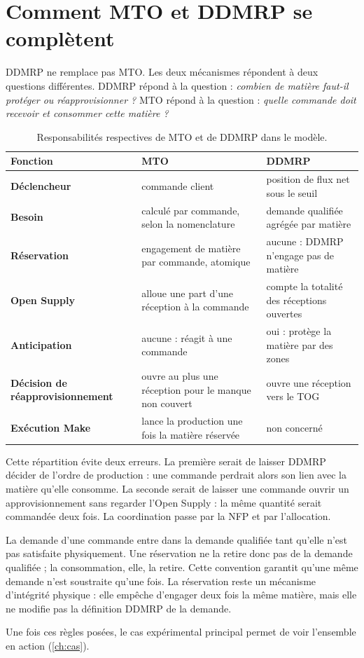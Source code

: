 \chapter{Comment MTO et DDMRP se complètent}\label{ch:mto-ddmrp}

DDMRP ne remplace pas MTO. Les deux mécanismes répondent à deux questions différentes.
DDMRP répond à la question : \emph{combien de matière faut-il protéger ou réapprovisionner ?}
MTO répond à la question : \emph{quelle commande doit recevoir et consommer cette matière ?}

\begin{table}[H]
  \centering
  \caption{Responsabilités respectives de MTO et de DDMRP dans le modèle.}\label{tab:mto-ddmrp}
  \begin{tabularx}{\textwidth}{@{}>{\bfseries}L{3.6cm}YY@{}}
    \toprule
    Fonction & MTO & DDMRP \\
    \midrule
    Déclencheur & commande client & position de flux net sous le seuil \\
    Besoin & calculé par commande, selon la nomenclature & demande qualifiée agrégée par matière \\
    Réservation & engagement de matière par commande, atomique & aucune : DDMRP n'engage pas de matière \\
    Open Supply & alloue une part d'une réception à la commande & compte la totalité des réceptions ouvertes \\
    Anticipation & aucune : réagit à une commande & oui : protège la matière par des zones \\
    Décision de réapprovisionnement & ouvre au plus une réception pour le manque non couvert & ouvre une réception vers le TOG \\
    Exécution Make & lance la production une fois la matière réservée & non concerné \\
    \bottomrule
  \end{tabularx}
\end{table}

Cette répartition évite deux erreurs. La première serait de laisser DDMRP décider de l'ordre de
production : une commande perdrait alors son lien avec la matière qu'elle consomme. La seconde
serait de laisser une commande ouvrir un approvisionnement sans regarder l'Open Supply : la même
quantité serait commandée deux fois. La coordination passe par la NFP et par l'allocation.

La demande d'une commande entre dans la demande qualifiée tant qu'elle n'est pas satisfaite
physiquement. Une réservation ne la retire donc pas de la demande qualifiée ; la consommation, elle,
la retire. Cette convention garantit qu'une même demande n'est soustraite qu'une fois. La
réservation reste un mécanisme d'intégrité physique : elle empêche d'engager deux fois la même
matière, mais elle ne modifie pas la définition DDMRP de la demande.

Une fois ces règles posées, le cas expérimental principal permet de voir l'ensemble en action
(\cref{ch:cas}).
